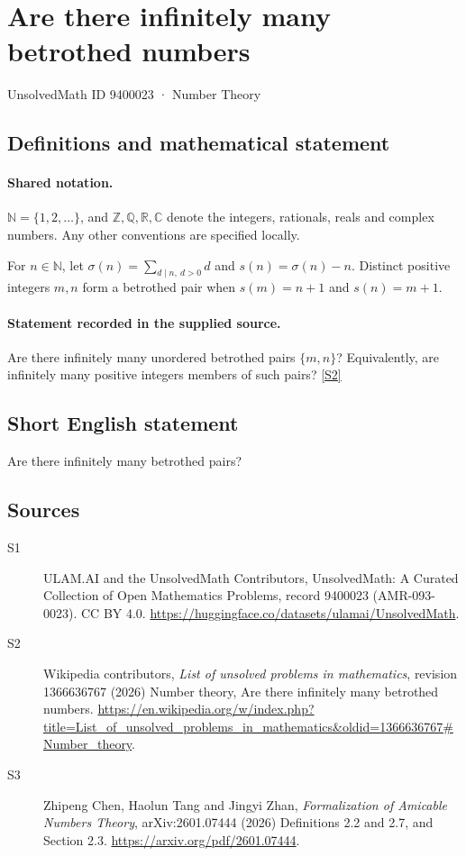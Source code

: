 \documentclass[11pt]{article}
\newcommand{\sref}[2]{\hyperlink{source:#1:#2}{[S#2]}}
\begin{document}
\setcounter{section}{9400022}
\section{Are there infinitely many betrothed numbers}\label{9400023}
{\small\sffamily UnsolvedMath ID 9400023 · Number Theory}
\subsection{Definitions and mathematical statement}

\paragraph{Shared notation.}$\mathbb N=\{1,2,\ldots\}$, and $\mathbb Z,\mathbb Q,\mathbb R,\mathbb C$ denote the integers, rationals, reals and complex numbers. Any other conventions are specified locally.


For $n\in\mathbb N$, let $\sigma(n)=\sum_{d\mid n,\ d>0}d$ and $s(n)=\sigma(n)-n$. Distinct positive integers $m,n$ form a betrothed pair when $s(m)=n+1$ and $s(n)=m+1$.
\paragraph{Statement recorded in the supplied source.}
Are there infinitely many unordered betrothed pairs $\{m,n\}$? Equivalently, are infinitely many positive integers members of such pairs? \sref{9400023}{2}
\subsection{Short English statement}
Are there infinitely many betrothed pairs?
\subsection{Sources}
\begin{description}
\item[\hypertarget{source:9400023:1}{S1}] ULAM.AI and the UnsolvedMath Contributors, UnsolvedMath: A Curated Collection of Open Mathematics Problems, record 9400023 (AMR-093-0023). CC BY 4.0. \url{https://huggingface.co/datasets/ulamai/UnsolvedMath}.
\item[\hypertarget{source:9400023:2}{S2}] Wikipedia contributors, \emph{List of unsolved problems in mathematics}, revision 1366636767 (2026) Number theory, Are there infinitely many betrothed numbers. \url{https://en.wikipedia.org/w/index.php?title=List_of_unsolved_problems_in_mathematics&oldid=1366636767#Number_theory}.
\item[\hypertarget{source:9400023:3}{S3}] Zhipeng Chen, Haolun Tang and Jingyi Zhan, \emph{Formalization of Amicable Numbers Theory}, arXiv:2601.07444 (2026) Definitions 2.2 and 2.7, and Section 2.3. \url{https://arxiv.org/pdf/2601.07444}.
\end{description}
\label{end:9400023}
\end{document}
